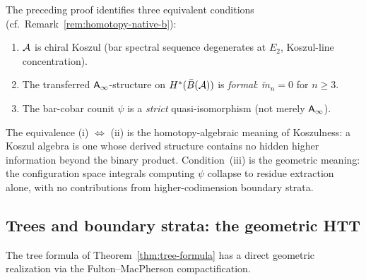 \begin{remark}
\label{rem:koszulness-formality-htt}
The preceding proof identifies three equivalent conditions
(cf.\ Remark~\ref{rem:homotopy-native-b}):
\begin{enumerate}[label=(\roman*)]
\item $\mathcal{A}$ is chiral Koszul (bar spectral sequence degenerates at
$E_2$, Koszul-line concentration).
\item The transferred $\mathsf{A}_{\infty}$-structure on $H^*(\bar{B}(\mathcal{A}))$ is
\emph{formal}: $\tilde{m}_n = 0$ for $n \geq 3$.
\item The bar-cobar counit $\psi$ is a \emph{strict}
quasi-isomorphism (not merely $\mathsf{A}_{\infty}$).
\end{enumerate}
The equivalence (i) $\Leftrightarrow$ (ii) is the homotopy-algebraic
meaning of Koszulness: a Koszul algebra is one whose derived
structure contains no hidden higher information beyond the binary
product.  Condition~(iii) is the geometric meaning: the
configuration space integrals computing $\psi$ collapse to residue
extraction alone, with no contributions from higher-codimension
boundary strata.
\end{remark}

\subsection{Trees and boundary strata: the geometric HTT}

The tree formula of Theorem~\ref{thm:tree-formula} has a direct
geometric realization via the Fulton--MacPherson compactification.

